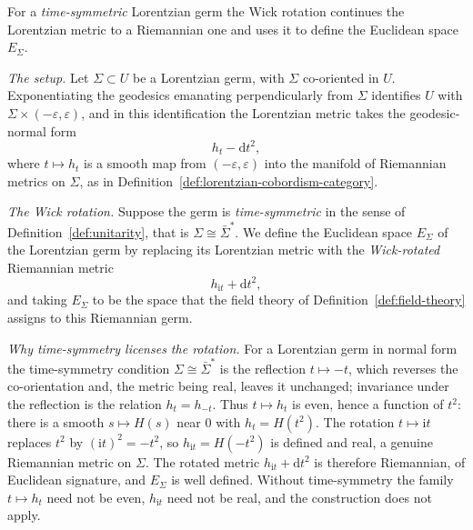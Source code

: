 \begin{definition}
  \label{def:wick-rotation}
  \notready
  For a \emph{time-symmetric} Lorentzian germ the Wick rotation continues the
  Lorentzian metric to a Riemannian one and uses it to define the Euclidean space
  $E_{\Sigma}$.

  \emph{The setup.} Let $\Sigma \subset U$ be a Lorentzian germ, with $\Sigma$
  co-oriented in $U$. Exponentiating the geodesics emanating perpendicularly from
  $\Sigma$ identifies $U$ with $\Sigma \times (-\varepsilon, \varepsilon)$, and in
  this identification the Lorentzian metric takes the geodesic-normal form
  \[ h_t - \mathrm{d}t^2, \]
  where $t \mapsto h_t$ is a smooth map from $(-\varepsilon, \varepsilon)$ into the
  manifold of Riemannian metrics on $\Sigma$, as in
  Definition~\ref{def:lorentzian-cobordism-category}.

  \emph{The Wick rotation.} Suppose the germ is \emph{time-symmetric} in the sense
  of Definition~\ref{def:unitarity}, that is $\Sigma \cong \bar\Sigma^*$. We define
  the Euclidean space $E_{\Sigma}$ of the Lorentzian germ by replacing its
  Lorentzian metric with the \emph{Wick-rotated} Riemannian metric
  \[ h_{\mathrm{i}t} + \mathrm{d}t^2, \]
  and taking $E_{\Sigma}$ to be the space that the field theory of
  Definition~\ref{def:field-theory} assigns to this Riemannian germ.

  \emph{Why time-symmetry licenses the rotation.} For a Lorentzian germ in normal
  form the time-symmetry condition $\Sigma \cong \bar\Sigma^*$ is the reflection
  $t \mapsto -t$, which reverses the co-orientation and, the metric being real,
  leaves it unchanged; invariance under the reflection is the relation
  $h_t = h_{-t}$. Thus $t \mapsto h_t$ is even, hence a function of $t^2$: there is
  a smooth $s \mapsto H(s)$ near $0$ with $h_t = H(t^2)$. The rotation
  $t \mapsto \mathrm{i}t$ replaces $t^2$ by $(\mathrm{i}t)^2 = -t^2$, so
  $h_{\mathrm{i}t} = H(-t^2)$ is defined and real, a genuine Riemannian metric on
  $\Sigma$. The rotated metric $h_{\mathrm{i}t} + \mathrm{d}t^2$ is therefore
  Riemannian, of Euclidean signature, and $E_{\Sigma}$ is well defined. Without
  time-symmetry the family $t \mapsto h_t$ need not be even, $h_{\mathrm{i}t}$ need
  not be real, and the construction does not apply.


\end{definition}
